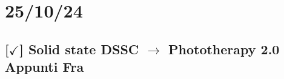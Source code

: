 \section{25/10/24}

\subsection{[$\checkmark$] Solid state DSSC $\rightarrow$ Phototherapy 2.0 Appunti Fra}

